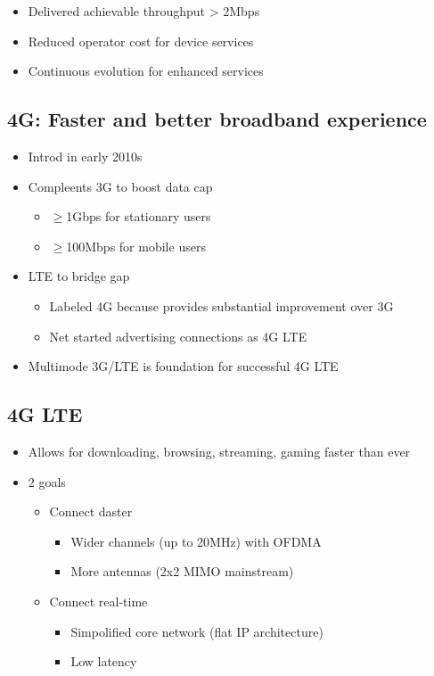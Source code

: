 \begin{itemize}
	\item Delivered achievable throughput > 2Mbps
	\item Reduced operator cost for device services
	\item Continuous evolution for enhanced services
\end{itemize}

\subsection{4G: Faster and better broadband experience}

\begin{itemize}
	\item Introd in early 2010s
	\item Compleents 3G to boost data cap
 	\begin{itemize}
		\item $\ge$1Gbps for stationary users
		\item $\ge$100Mbps for mobile users
 	\end{itemize}
	\item LTE to bridge gap
	\begin{itemize}
		\item Labeled 4G because provides substantial improvement over
			3G
		\item Net started advertising connections as 4G LTE
	\end{itemize}
	\item Multimode 3G/LTE is foundation for successful 4G LTE
\end{itemize}

\subsection{4G LTE}

\begin{itemize}
	\item Allows for downloading, browsing, streaming, gaming faster than
		ever
	\item 2 goals
	\begin{itemize}
		\item Connect daster
		\begin{itemize}
			\item Wider channels (up to 20MHz) with OFDMA
			\item More antennas (2x2 MIMO mainstream)
		\end{itemize}
		\item Connect real-time
		\begin{itemize}
			\item Simpolified core network (flat IP architecture)
			\item Low latency
		\end{itemize}
	\end{itemize}
\end{itemize}

